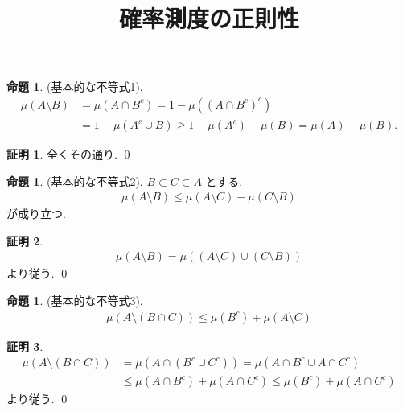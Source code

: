 \documentclass[10pt, fleqn, label-section=none]{bxjsarticle}
\title{確率測度の正則性}
\date{}
\author{}
\theoremstyle{definition}
\newtheorem{prop}[dfn]{命題}
\newtheorem*{pf*}{証明}
\renewcommand{\;}{\, ; \,}
\begin{document}
\maketitle


\section{}
\begin{prop}(基本的な不等式1).
\begin{align*} \mu(A \setminus B) &= \mu (A \cap B^c) = 1 - \mu((A \cap B^c)^c) \\
&= 1 - \mu(A^c \cup B) \geq 1 - \mu(A^c) - \mu(B) =  \mu(A) - \mu(B). \end{align*}
\end{prop}
\begin{pf*}
全くその通り.
\qed
\end{pf*}

\begin{prop}(基本的な不等式2). $B \subset C \subset A$ とする. 
\begin{align*} \mu(A \setminus B) \leq \mu (A \setminus C) + \mu (C \setminus B)\end{align*}
が成り立つ.
\end{prop}
\begin{pf*}
\begin{align*}  \mu(A \setminus B) = \mu ((A \setminus C) \cup (C \setminus B)) \end{align*}
より従う.
\qed
\end{pf*}

\begin{prop}(基本的な不等式3). 
\begin{align*} \mu(A \setminus (B \cap C) ) \leq \mu(B^c) + \mu(A \setminus C)
 \end{align*}
\end{prop}
\begin{pf*}
\begin{align*}\mu(A \setminus (B \cap C) ) 
&= \mu(A \cap (B^c \cup C^c) ) = \mu(A \cap B^c \cup A \cap C^c) \\&\leq  \mu(A \cap B^c) + \mu( A \cap C^c) 
\leq  \mu(B^c) + \mu( A \cap C^c) 
\end{align*}
より従う.
\qed
\end{pf*}


\section{}
\end{document}
